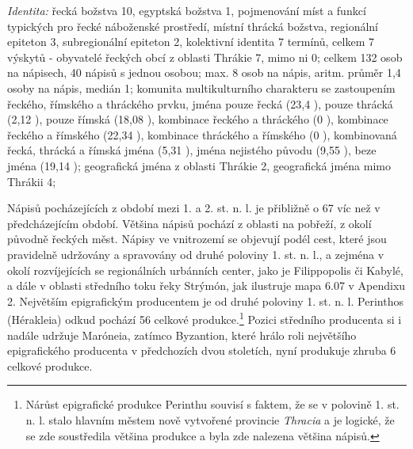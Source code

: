 {\em Identita:} řecká božstva 10, egyptská božstva 1, pojmenování míst a funkcí typických pro řecké náboženské prostředí, místní thrácká božstva, regionální epiteton 3, subregionální epiteton 2, kolektivní identita 7 termínů, celkem 7 výskytů - obyvatelé řeckých obcí z oblasti Thrákie 7, mimo ni 0; celkem 132 osob na nápisech, 40 nápisů s jednou osobou; max. 8 osob na nápis, aritm. průměr 1,4 osoby na nápis, medián 1; komunita multikulturního charakteru se zastoupením řeckého, římského a thráckého prvku, jména pouze řecká (23,4 ), pouze thrácká (2,12 ), pouze římská (18,08 ), kombinace řeckého a thráckého (0 ), kombinace řeckého a římského (22,34 ), kombinace thráckého a římského (0 ), kombinovaná řecká, thrácká a římská jména (5,31 ), jména nejistého původu (9,55 ), beze jména (19,14 ); geografická jména z oblasti Thrákie 2, geografická jména mimo Thrákii 4;

\NC\AR
\HL
\HL
\stoptable

Nápisů pocházejících z období mezi 1. a 2. st. n. l. je přibližně o 67  víc než v předcházejícím období. Většina nápisů pochází z oblasti na pobřeží, z okolí původně řeckých měst. Nápisy ve vnitrozemí se objevují podél cest, které jsou pravidelně udržovány a spravovány od druhé poloviny 1. st. n. l., a zejména v okolí rozvíjejících se regionálních urbánních center, jako je Filippopolis či Kabylé, a dále v oblasti středního toku řeky Strýmón, jak ilustruje mapa 6.07 v Apendixu 2. Největším epigrafickým producentem je od druhé poloviny 1. st. n. l. Perinthos (Hérakleia) odkud pochází 56  celkové produkce.\footnote{Nárůst epigrafické produkce Perinthu souvisí s faktem, že se v polovině 1. st. n. l. stalo hlavním městem nově vytvořené provincie {\em Thracia} a je logické, že se zde soustředila většina produkce a byla zde nalezena většina nápisů.} Pozici středního producenta si i nadále udržuje Maróneia, zatímco Byzantion, které hrálo roli největšího epigrafického producenta v předchozích dvou stoletích, nyní produkuje zhruba 6  celkové produkce.

